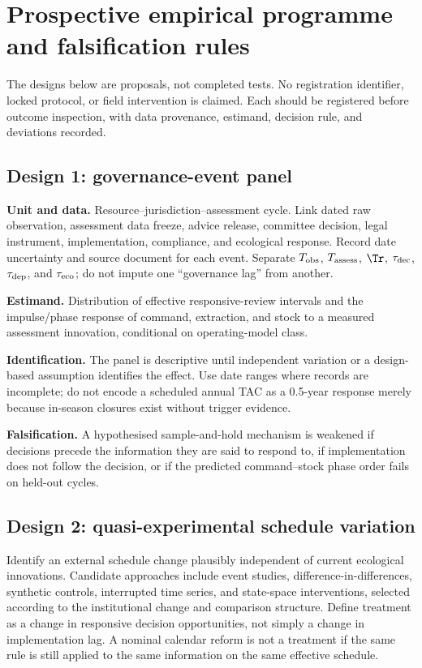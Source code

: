 \section{Prospective empirical programme and falsification rules}\label{si:designs}

The designs below are proposals, not completed tests. No registration identifier, locked protocol, or field intervention is claimed. Each should be registered before outcome inspection, with data provenance, estimand, decision rule, and deviations recorded.

\subsection{Design 1: governance-event panel}

\textbf{Unit and data.} Resource--jurisdiction--assessment cycle. Link dated raw observation, assessment data freeze, advice release, committee decision, legal instrument, implementation, compliance, and ecological response. Record date uncertainty and source document for each event. Separate \(T_{\rm obs}\), \(T_{\rm assess}\), \(\Tr\), \(\tau_{\rm dec}\), \(\tau_{\rm dep}\), and \(\tau_{\rm eco}\); do not impute one ``governance lag'' from another.

\textbf{Estimand.} Distribution of effective responsive-review intervals and the impulse/phase response of command, extraction, and stock to a measured assessment innovation, conditional on operating-model class.

\textbf{Identification.} The panel is descriptive until independent variation or a design-based assumption identifies the effect. Use date ranges where records are incomplete; do not encode a scheduled annual TAC as a 0.5-year response merely because in-season closures exist without trigger evidence.

\textbf{Falsification.} A hypothesised sample-and-hold mechanism is weakened if decisions precede the information they are said to respond to, if implementation does not follow the decision, or if the predicted command--stock phase order fails on held-out cycles.

\subsection{Design 2: quasi-experimental schedule variation}

Identify an external schedule change plausibly independent of current ecological innovations. Candidate approaches include event studies, difference-in-differences, synthetic controls, interrupted time series, and state-space interventions, selected according to the institutional change and comparison structure. Define treatment as a change in responsive decision opportunities, not simply a change in implementation lag. A nominal calendar reform is not a treatment if the same rule is still applied to the same information on the same effective schedule.

